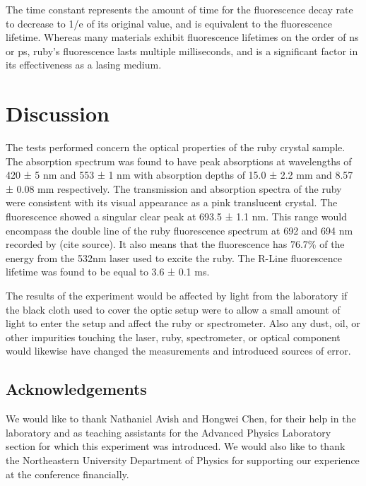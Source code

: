 \documentclass[11pt, a4paper, twocolumn]{article}
\begin{document}
The time constant represents the amount of time for the fluorescence decay rate to decrease to 1/e of its original value, and is equivalent to the fluorescence lifetime. Whereas many materials exhibit fluorescence lifetimes on the order of ns or ps, ruby’s fluorescence lasts multiple milliseconds, and is a significant factor in its effectiveness as a lasing medium.

\section*{Discussion}
The tests performed concern the optical properties of the ruby crystal sample. The absorption spectrum was found to have peak absorptions at wavelengths of 420 ± 5 nm and 553 ± 1 nm with absorption depths of 15.0 ± 2.2 mm and 8.57 ± 0.08 mm respectively. The transmission and absorption spectra of the ruby were consistent with its visual appearance as a pink translucent crystal. The fluorescence showed a singular clear peak at 693.5 ± 1.1 nm. This range would encompass the double line of the ruby fluorescence spectrum at 692 and 694 nm recorded by (cite source). It also means that the fluorescence has 76.7\% of the energy from the 532nm laser used to excite the ruby. The R-Line fluorescence lifetime was found to be equal to 3.6 ± 0.1 ms.

The results of the experiment would be affected by light from the laboratory if the black cloth used to cover the optic setup were to allow a small amount of light to enter the setup and affect the ruby or spectrometer. Also any dust, oil, or other impurities touching the laser, ruby, spectrometer, or optical component would likewise have changed the measurements and introduced sources of error.

\subsection*{Acknowledgements}
We would like to thank Nathaniel Avish and Hongwei Chen, for their help in the laboratory and as teaching assistants for the Advanced Physics Laboratory section for which this experiment was introduced. We would also like to thank the Northeastern University Department of Physics for supporting our experience at the conference financially.

\nocite{*}


\end{document}
